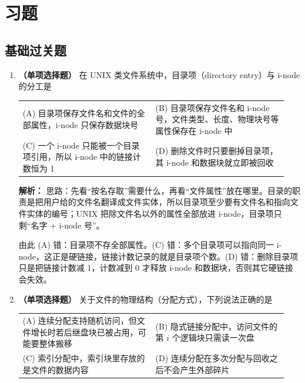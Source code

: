 \section{习题}

\subsection{基础过关题}

\begin{enumerate}

\item \textbf{（单项选择题）} 在 UNIX 类文件系统中，目录项（directory entry）与 i-node 的分工是
\begin{center}
\begin{tabular}{p{0.47\linewidth}p{0.47\linewidth}}
(A) 目录项保存文件名和文件的全部属性，i-node 只保存数据块号 & (B) 目录项保存文件名和 i-node 号，文件类型、长度、物理块号等属性保存在 i-node 中 \\[4pt]
(C) 一个 i-node 只能被一个目录项引用，所以 i-node 中的链接计数恒为 1 & (D) 删除文件时只要删掉目录项，其 i-node 和数据块就立即被回收
\end{tabular}
\end{center}

\ifshowsolutions\par\noindent\textbf{解析：} 思路：先看“按名存取”需要什么，再看“文件属性”放在哪里。目录的职责是把用户给的文件名翻译成文件实体，所以目录项至少要有文件名和指向文件实体的编号；UNIX 把除文件名以外的属性全部放进 i-node，目录项只剩“名字 + i-node 号”。

由此 (A) 错：目录项不存全部属性。(C) 错：多个目录项可以指向同一 i-node，这正是硬链接，链接计数记录的就是目录项个数。(D) 错：删除目录项只是把链接计数减 1，计数减到 0 才释放 i-node 和数据块，否则其它硬链接会失效。\else \answerarea \fi

\vspace{8pt}

\item \textbf{（单项选择题）} 关于文件的物理结构（分配方式），下列说法正确的是
\begin{center}
\begin{tabular}{p{0.47\linewidth}p{0.47\linewidth}}
(A) 连续分配支持随机访问，但文件增长时若后继盘块已被占用，可能要整体搬移 & (B) 隐式链接分配中，访问文件的第 $i$ 个逻辑块只需读一次盘 \\[4pt]
(C) 索引分配中，索引块里存放的是文件的数据内容 & (D) 连续分配在多次分配与回收之后不会产生外部碎片
\end{tabular}
\end{center}


\end{enumerate}
